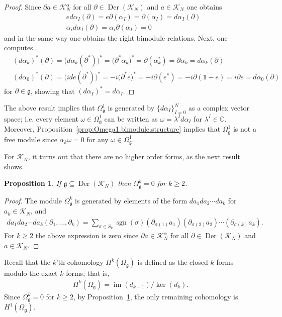 \documentclass{amsart}
\newcommand{\complex}{\mathbb{C}}
\newcommand{\paraa}[1]{\big(#1\big)}
\newcommand{\sgn}{\operatorname{sgn}}
\newcommand{\im}{\operatorname{im}}
\newtheorem{proposition}[theorem]{Proposition}
\theoremstyle{definition}
\theoremstyle{remark}
\numberwithin{equation}{section}
\newcommand{\K}{\mathcal{K}}
\renewcommand{\mid}{\mathds{1}}
\newcommand{\KN}{\K_N}
\newcommand{\KaN}{\K^\alpha_N}
\renewcommand{\d}{\partial}
\newcommand{\Der}{\operatorname{Der}}
\newcommand{\g}{\mathfrak{g}}
\newcommand{\Omegag}[1]{\Omega^{#1}_{\g}}
\newcommand{\Omegaoneg}{\Omega^1_{\g}}
\begin{document}
\begin{proof}
  Since $\d a\in\KaN$ for all $\d\in\Der(\KN)$ and $a\in\KN$ one obtains
  \begin{align*}
    &ed\alpha_I(\d) = e\d(\alpha_I) = \d(\alpha_I)=d\alpha_I(\d)\\
    &\alpha_id\alpha_I(\d) = \alpha_i\d(\alpha_I) = 0
  \end{align*}
  and in the same way one obtains the right bimodule relations.
  Next, one computes
  \begin{align*}
    &(d\alpha_k)^\ast(\d) = \paraa{d\alpha_k(\d^\ast)}^\ast
      = \paraa{\d^\ast\alpha_k}^\ast = \d(\alpha_k^\ast)
      =\d\alpha_k = d\alpha_k(\d)\\
    &(d\alpha_0)^\ast(\d) = \paraa{ide(\d^\ast)}^\ast
      = -i\paraa{\d^\ast e}^\ast = -i\d(e^\ast) = -i\d(\mid-e)
      =i\d e = d\alpha_0(\d)
  \end{align*}
  for $\d\in\g$, showing that $(d\alpha_I)^\ast=d\alpha_I$.
\end{proof}

\noindent
The above result implies that $\Omegaoneg$ is generated by
$\{d\alpha_I\}_{I=0}^N$ as a complex vector space; i.e. every element
$\omega\in\Omegaoneg$ can be written as $\omega=\lambda^Id\alpha_I$
for $\lambda^I\in\complex$. Moreover,
Proposition~\ref{prop:Omega1.bimodule.structure} implies that
$\Omegaoneg$ is not a free module since $\alpha_k\omega=0$ for any
$\omega\in\Omegaoneg$.

For $\KN$, it turns out that there are no higher order forms, as the
next result shows.

\begin{proposition}\label{prop:Omegak.zero}
  If $\g\subseteq\Der(\KN)$ then $\Omegag{k}=0$ for $k\geq 2$.
\end{proposition}

\begin{proof}
  The module $\Omegag{k}$ is generated by elements of the form
  $da_1da_2\cdots da_k$ for $a_k\in\KN$, and
  \begin{align*}
    da_1da_2\cdots da_k(\d_1,\ldots,\d_k)
    =\sum_{\sigma\in S_k}\sgn(\sigma)(\d_{\sigma(1)}a_1)(\d_{\sigma(2)}a_2)\cdots(\d_{\sigma(k)}a_k).
  \end{align*}
  For $k\geq 2$ the above expression is zero since $\d a\in\KaN$ for
  all $\d\in\Der(\KN)$ and $a\in\KN$.
\end{proof}

\noindent
Recall that the $k$'th cohomology $H^k(\Omegag{})$ is defined  as the
closed $k$-forms modulo the exact $k$-forms; that is,
\begin{align*}
  H^k(\Omegag{}) = \im(d_{k-1})\slash \ker(d_k).
\end{align*}
Since $\Omegag{k}=0$ for $k\geq 2$, by
Proposition~\ref{prop:Omegak.zero}, the only remaining cohomology is
$H^1(\Omegag{})$.
\end{document}
